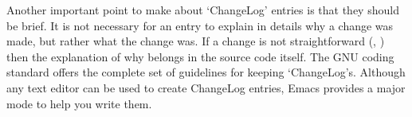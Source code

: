 Another important point to make about `ChangeLog' entries is that they should 
be brief. It is not necessary for an entry to explain in details why a change 
was made, but rather what the change was. If a change is not 
straightforward ({\MeQ{}}, {\MbQ{}}) then the explanation of why belongs in the 
source code itself. The GNU coding standard offers the complete set of 
guidelines for keeping `ChangeLog's. Although any text editor can be used to 
create ChangeLog entries, Emacs provides a major mode to help you write them.

